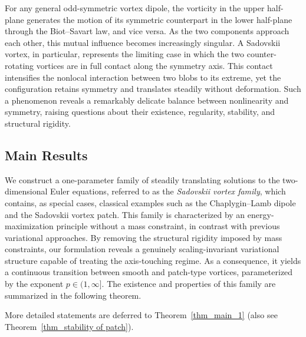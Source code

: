 \documentclass[11pt]{amsart}
\theoremstyle{definition}
\theoremstyle{definition}
\numberwithin{equation}{section}
\newcommand{\0}{\emptyset}
\begin{document}
	\medskip
	
	
	For any general odd-symmetric vortex dipole, the vorticity in the upper half-plane generates the motion of its symmetric counterpart in the lower half-plane through the Biot--Savart law, and vice versa. As the two components approach each other, this mutual influence becomes increasingly singular. A Sadovskii vortex, in particular, represents the limiting case in which the two counter-rotating vortices are in full contact along the symmetry axis. This contact intensifies the nonlocal interaction between two blobs to its extreme, yet the configuration retains symmetry and translates steadily without deformation.
	Such a phenomenon reveals a remarkably delicate balance between nonlinearity and symmetry, raising questions about their existence, regularity, stability, and structural rigidity.
	
	
	\subsection{Main Results}
	
We construct a one-parameter family of steadily translating
solutions to the two-dimensional Euler equations, referred to as the \textit{Sadovskii vortex family}, which contains, as special cases,  classical examples such as the Chaplygin--Lamb dipole and the Sadovskii vortex patch. 
This family is characterized by an energy-maximization principle 
without a mass constraint, in contrast with previous variational approaches.
By removing the structural rigidity imposed by mass constraints, our formulation reveals a genuinely scaling-invariant variational structure capable of treating the axis-touching regime.     
As a consequence, it yields a continuous transition between smooth and patch-type vortices, parameterized by the exponent $p\in(1,\infty]$. 
The existence and properties of this family are summarized in the following theorem.

\medskip
\noindent More detailed statements are deferred to Theorem~\ref{thm_main_1} (also see Theorem~\ref{thm_stability of patch}).
\end{document}
